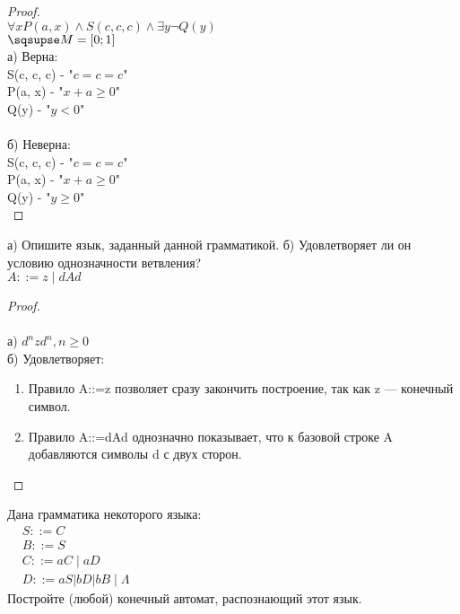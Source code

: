 \begin{proof} $ $\\
    $ \forall x P(a, x) \wedge S(c, c, c) \land \exists y \neg Q(y)$\\
    $\sqsupse M = [0; 1]$ \\
    а) Верна:\\
    S(c, c, c) - "$c = c = c$" \\
    P(a, x) - "$x + a \geq 0$" \\
    Q(y) - "$y < 0$" \\\\
    б) Неверна:\\
    S(c, c, c) - "$c = c = c$" \\
    P(a, x) - "$x + a \geq 0$" \\
    Q(y) - "$y \geq 0$" \\
\end{proof}

\begin{problem}
    а) Опишите язык, заданный данной грамматикой. б) Удовлетворяет ли он условию однозначности ветвления?\\
    $A::=z \mid d A d$
\end{problem}

\begin{proof} $ $\\\\
    а) $d^n z d^n, n \geq 0$ \\
    б) Удовлетворяет: \\
    \begin{enumerate}
        \item Правило A::=z позволяет сразу закончить построение, так как z — конечный символ.
        \item Правило A::=dAd однозначно показывает, что к базовой строке A добавляются символы d с двух сторон.
    \end{enumerate}
\end{proof}

\begin{problem}
     Дана грамматика некоторого языка:\\
    $\begin{aligned} & S::=C \\ & B::=S \\ & C::=a C \mid a D \\ & D::=a S|b D| b B \mid \Lambda\end{aligned}$\\
    Постройте (любой) конечный автомат, распознающий этот язык.
\end{problem}

